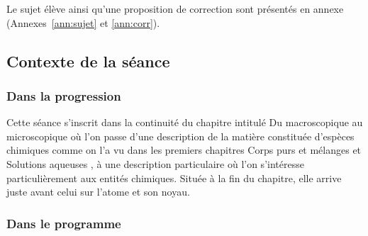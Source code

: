 \documentclass[12pt,a4paper]{article}
\begin{document}
Le sujet élève ainsi qu'une proposition de correction sont présentés en annexe (Annexes~\ref{ann:sujet} et \ref{ann:corr}).

\subsection{Contexte de la séance}

\subsubsection{Dans la progression}

Cette séance s'inscrit dans la continuité du chapitre intitulé \og Du macroscopique au microscopique \fg{} où l'on passe d'une description de la matière constituée d'espèces chimiques comme on l'a vu dans les premiers chapitres \og Corps purs et mélanges \fg{} et \og Solutions aqueuses \fg{}, à une description particulaire où l'on s'intéresse particulièrement aux entités chimiques.
Située à la fin du chapitre, elle arrive juste avant celui sur l'atome et son noyau.

\subsubsection{Dans le programme}
\end{document}
